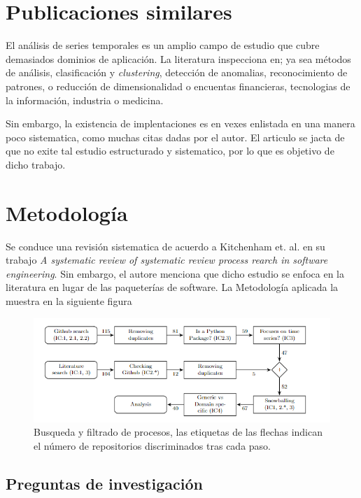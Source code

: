 \documentclass[a4paper, 11pt]{article}
\begin{document}
\section{Publicaciones similares}

El análisis de series temporales es un amplio campo de estudio que cubre demasiados dominios de aplicación. La literatura inspecciona en; ya sea métodos de análisis, clasificación y \textit{clustering}, detección de anomalias, reconocimiento de patrones, o reducción de dimensionalidad o encuentas financieras, tecnologias de la información, industria o medicina.

Sin embargo, la existencia de implentaciones es en vexes enlistada en una manera poco sistematica, como muchas citas dadas por el autor. El articulo se jacta de que no exite tal estudio estructurado y sistematico, por lo que es objetivo de dicho trabajo. 


\section{Metodología}

Se conduce una revisión sistematica de acuerdo a Kitchenham et. al. en su trabajo \textit{A systematic review of systematic review process rearch in software engineering}. Sin embargo, el autore menciona que dicho estudio se enfoca en la literatura en lugar de las paqueterías de software. La Metodología aplicada la muestra en la siguiente figura

\begin{figure}[H] 
    \centering 
    \includegraphics[width = 14cm]{Figures/metodologia.png } 
    \caption{Busqueda y filtrado de procesos, las etiquetas de las flechas indican el número de repositorios discriminados tras cada paso.}
    \label{Fig. 01}     
\end{figure}

\subsection{Preguntas de investigación}
\end{document}
